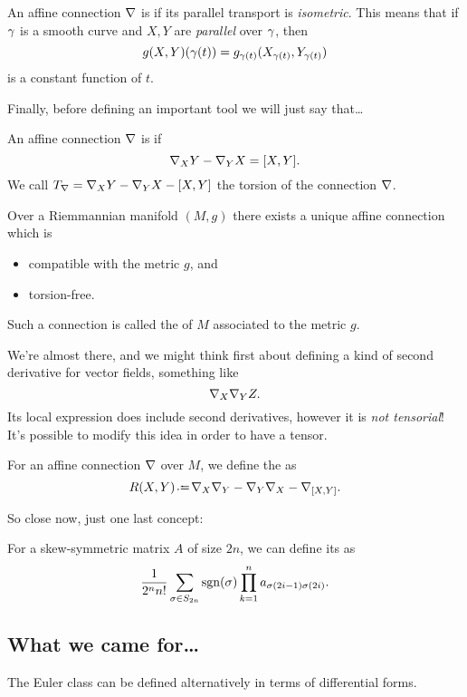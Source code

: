 \documentclass[12pt]{memoir}
\begin{document}
\begin{Def}
    An affine connection ${\mathbf{\nabla}}$ is  if its parallel transport is \emph{isometric}. This means that if $\gamma$ is a smooth curve and $X,Y$ are \emph{parallel} over $\gamma$, then 
    $$g(X,Y)(\gamma(t))=g_{\gamma(t)}(X_{\gamma(t)},Y_{\gamma(t)})$$
    is a constant function of $t$.
\end{Def}

Finally, before defining an important tool we will just say that\dots

\begin{Def}
    An affine connection ${\mathbf{\nabla}}$ is  if 
    $${\mathbf{\nabla}}_XY-{\mathbf{\nabla}}_YX=[X,Y].$$
    We call $T_{\mathbf{\nabla}}={\mathbf{\nabla}}_XY-{\mathbf{\nabla}}_YX-[X,Y]$ the torsion of the connection ${\mathbf{\nabla}}$.
\end{Def}

\begin{Th}
    Over a Riemmannian manifold $(M,g)$ there exists a unique affine connection which is 
    \begin{itemize}
        \item compatible with the metric $g$, and
        \item torsion-free.
    \end{itemize}
    Such a connection is called the  of $M$ associated to the metric $g$.
\end{Th}

We're almost there, and we might think first about defining a kind of second derivative for vector fields, something like
$${\mathbf{\nabla}}_X{\mathbf{\nabla}}_YZ.$$
Its local expression does include second derivatives, however it is \emph{not tensorial}! It's possible to modify this idea in order to have a tensor.

\begin{Def}
    For an affine connection ${\mathbf{\nabla}}$ over $M$, we define the  as 
    $$R(X,Y)\defeq \nbf_X\nbf_Y-\nbf_Y\nbf_X-\nbf_{[X,Y]}.$$
\end{Def}

So close now, just one last concept:

\begin{Def}
    For a skew-symmetric matrix $A$ of size $2n$, we can define its  as 
    $$\frac{1}{2^nn!}\sum_{\sigma\in S_{2n}}\operatorname{sgn}(\sigma)\prod_{k=1}^{n}a_{\sigma(2i-1)\sigma(2i)}.$$
\end{Def}

\subsection{What we came for\dots}
The Euler class can be defined alternatively in terms of differential forms. 
\end{document}
